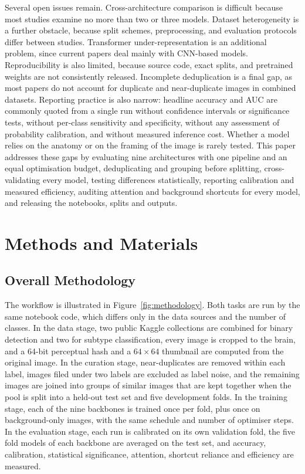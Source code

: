 \documentclass[final,3p,times,number]{elsarticle}
\begin{document}
Several open issues remain. Cross-architecture comparison is difficult because most studies examine no more than two or three models. Dataset heterogeneity is a further obstacle, because split schemes, preprocessing, and evaluation protocols differ between studies. Transformer under-representation is an additional problem, since current papers deal mainly with CNN-based models. Reproducibility is also limited, because source code, exact splits, and pretrained weights are not consistently released. Incomplete deduplication is a final gap, as most papers do not account for duplicate and near-duplicate images in combined datasets. Reporting practice is also narrow: headline accuracy and AUC are commonly quoted from a single run without confidence intervals or significance tests, without per-class sensitivity and specificity, without any assessment of probability calibration, and without measured inference cost. Whether a model relies on the anatomy or on the framing of the image is rarely tested. This paper addresses these gaps by evaluating nine architectures with one pipeline and an equal optimisation budget, deduplicating and grouping before splitting, cross-validating every model, testing differences statistically, reporting calibration and measured efficiency, auditing attention and background shortcuts for every model, and releasing the notebooks, splits and outputs.

\section{Methods and Materials}
\label{sec:methods}

\subsection{Overall Methodology}
\label{sec:workflow}

The workflow is illustrated in Figure~\ref{fig:methodology}. Both tasks are run by the same notebook code, which differs only in the data sources and the number of classes. In the data stage, two public Kaggle collections are combined for binary detection and two for subtype classification, every image is cropped to the brain, and a 64-bit perceptual hash and a $64\times 64$ thumbnail are computed from the original image. In the curation stage, near-duplicates are removed within each label, images filed under two labels are excluded as label noise, and the remaining images are joined into groups of similar images that are kept together when the pool is split into a held-out test set and five development folds. In the training stage, each of the nine backbones is trained once per fold, plus once on background-only images, with the same schedule and number of optimiser steps. In the evaluation stage, each run is calibrated on its own validation fold, the five fold models of each backbone are averaged on the test set, and accuracy, calibration, statistical significance, attention, shortcut reliance and efficiency are measured.
\end{document}
